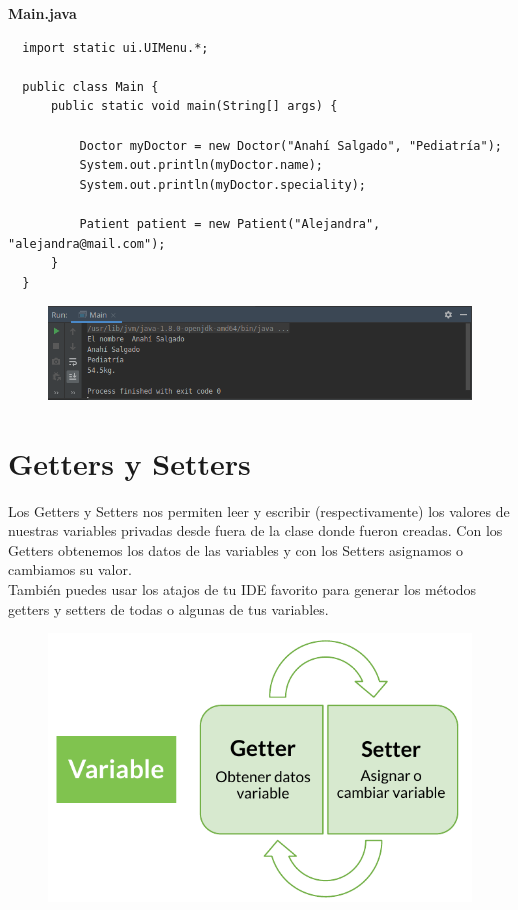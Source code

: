 \documentclass{article}
\begin{document}
\textbf{Main.java}
\begin{verbatim}
  import static ui.UIMenu.*;

  public class Main {
      public static void main(String[] args) {

          Doctor myDoctor = new Doctor("Anahí Salgado", "Pediatría");
          System.out.println(myDoctor.name);
          System.out.println(myDoctor.speciality);

          Patient patient = new Patient("Alejandra", "alejandra@mail.com");
      }
  }
\end{verbatim}

\begin{figure}[h!]
  \centering
  \includegraphics[scale=0.75]{./Pictures/031_resultado_encaps.png}
\end{figure}



\newpage
\section{Getters y Setters}%
Los Getters y Setters nos permiten leer y escribir (respectivamente) los
valores de nuestras variables privadas desde fuera de la clase donde fueron
creadas. Con los Getters obtenemos los datos de las variables y con los Setters
asignamos o cambiamos su valor.\\

También puedes usar los atajos de tu IDE favorito para generar los métodos
getters y setters de todas o algunas de tus variables.\\

\begin{figure}[h!]
  \centering
  \includegraphics[scale=0.5]{./Pictures/032_get_set.png}
\end{figure}
\end{document}
